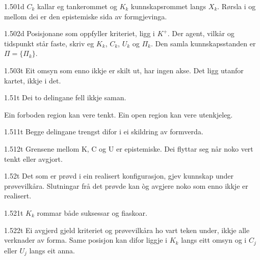 \begin{formproposition}{1.501}{d}
\(C_k\) kallar eg tankerommet og \(K_k\) kunnskapsrommet langs \(X_k\). Rørsla i og mellom dei er den epistemiske sida av formgjevinga.
\end{formproposition}

\begin{formproposition}{1.502}{d}
Posisjonane som oppfyller kriteriet, ligg i \(K^+\). Der agent, vilkår og tidspunkt står faste, skriv eg \(K_k\), \(C_k\), \(U_k\) og \(\Pi_k\). Den samla kunnskapsstanden er \(\Pi=\{\Pi_k\}\).
\end{formproposition}

\begin{formproposition}{1.503}{t}
Eit omsyn som enno ikkje er skilt ut, har ingen akse. Det ligg utanfor kartet, ikkje i det.
\end{formproposition}

\begin{formproposition}{1.51}{t}
Dei to delingane fell ikkje saman.

Ein forboden region kan vere tenkt. Ein open region kan vere utenkjeleg.
\end{formproposition}

\begin{formproposition}{1.511}{t}
Begge delingane trengst difor i ei skildring av formverda.
\end{formproposition}

\begin{formproposition}{1.512}{t}
Grensene mellom K, C og U er epistemiske. Dei flyttar seg når noko vert tenkt eller avgjort.
\end{formproposition}

\begin{formproposition}{1.52}{t}
Det som er prøvd i ein realisert konfigurasjon, gjev kunnskap under prøvevilkåra. Slutningar frå det prøvde kan òg avgjere noko som enno ikkje er realisert.
\end{formproposition}

\begin{formproposition}{1.521}{t}
\(K_k\) rommar både suksessar og fiaskoar.
\end{formproposition}

\begin{formproposition}{1.522}{t}
Ei avgjerd gjeld kriteriet og prøvevilkåra ho vart teken under, ikkje alle verknader av forma. Same posisjon kan difor liggje i \(K_k\) langs eitt omsyn og i \(C_j\) eller \(U_j\) langs eit anna.
\end{formproposition}

